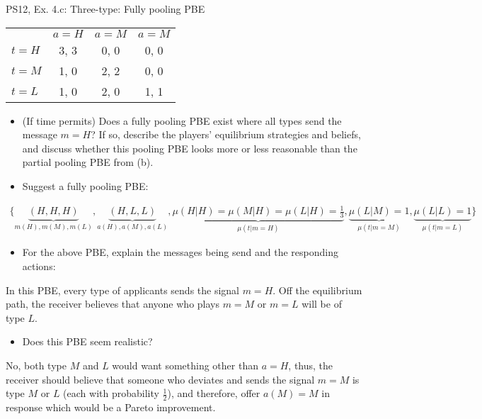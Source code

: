 \begin{frame}{PS12, Ex. 4.c: Three-type: Fully pooling PBE}
    \begin{table}
      \begin{tabular}{l|c|c|c|}
          \multicolumn{1}{c}{} & \multicolumn{1}{c}{$a=H$} & \multicolumn{1}{c}{$a=M$} & \multicolumn{1}{c}{$a=M$} \\\cline{2-4}
          $t=H$ & 3, 3 & 0, 0 & 0, 0 \\\cline{2-4}
          $t=M$ & 1, 0 & 2, 2 & 0, 0 \\\cline{2-4}
          $t=L$ & 1, 0 & 2, 0 & 1, 1 \\\cline{2-4}
      \end{tabular}
    \end{table}\vspace{-8pt}
    \begin{itemize}
      \item[(c)] (If time permits) Does a fully pooling PBE exist where all types send the message $m = H$? If so, describe the players’ equilibrium strategies and beliefs, and discuss whether this pooling PBE looks more or less reasonable than the partial pooling PBE from (b).
      \item[Step 1:] Suggest a fully pooling PBE:
    \end{itemize}\vspace{-12pt}
    \begin{align*}
      \{\underbrace{(H,H,H)}_{m(H),m(M),m(L)},\underbrace{(H,L,L)}_{a(H),a(M),a(L)},\underbrace{\mu(H|H)=\mu(M|H)=\mu(L|H)=\frac{1}{3}}_{\mu(t|m=H)},\underbrace{\mu(L|M)=1}_{\mu(t|m=M)},\underbrace{\mu(L|L)=1}_{\mu(t|m=L)}\}
    \end{align*}\vspace{-14pt}
    \begin{itemize}
        \item[Step 2:] For the above PBE, explain the messages being send and the responding actions:
    \end{itemize}\vspace{-2pt}
    In this PBE, every type of applicants sends the signal $m=H$. Off the equilibrium path, the receiver believes that anyone who plays $m=M$ or $m=L$ will be of type $L$.\vspace{-2pt}
    \begin{itemize}
        \item[Step 3:] Does this PBE seem realistic?
    \end{itemize}\vspace{-2pt}
    No, both type $M$ and $L$ would want something other than $a=H$, thus, the receiver should believe that someone who deviates and sends the signal $m=M$ is type $M$ or $L$ (each with probability $\frac{1}{2}$), and therefore, offer $a(M)=M$ in response which would be a Pareto improvement.
    \vfill\null
\end{frame}
